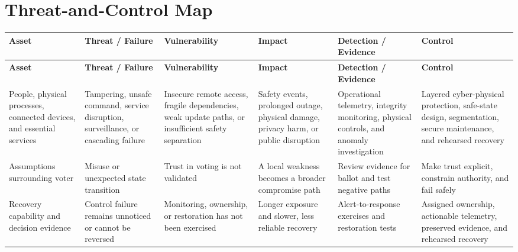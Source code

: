 \documentclass[11pt,letterpaper]{article}
\begin{document}
\section*{Threat-and-Control Map}
\begingroup\scriptsize\setlength{\tabcolsep}{2pt}
\begin{longtable}{>{\raggedright\arraybackslash}p{}>{\raggedright\arraybackslash}p{}>{\raggedright\arraybackslash}p{}>{\raggedright\arraybackslash}p{}>{\raggedright\arraybackslash}p{}>{\raggedright\arraybackslash}p{}}
\toprule\rowcolor{Navy}\color{white}\textbf{Asset} & \color{white}\textbf{Threat / Failure} & \color{white}\textbf{Vulnerability} & \color{white}\textbf{Impact} & \color{white}\textbf{Detection / Evidence} & \color{white}\textbf{Control}\\\midrule
\endfirsthead
\toprule\rowcolor{Navy}\color{white}\textbf{Asset} & \color{white}\textbf{Threat / Failure} & \color{white}\textbf{Vulnerability} & \color{white}\textbf{Impact} & \color{white}\textbf{Detection / Evidence} & \color{white}\textbf{Control}\\\midrule
\endhead
People, physical processes, connected devices, and essential services & Tampering, unsafe command, service disruption, surveillance, or cascading failure & Insecure remote access, fragile dependencies, weak update paths, or insufficient safety separation & Safety events, prolonged outage, physical damage, privacy harm, or public disruption & Operational telemetry, integrity monitoring, physical controls, and anomaly investigation & Layered cyber-physical protection, safe-state design, segmentation, secure maintenance, and rehearsed recovery\\\midrule
Assumptions surrounding voter & Misuse or unexpected state transition & Trust in voting is not validated & A local weakness becomes a broader compromise path & Review evidence for ballot and test negative paths & Make trust explicit, constrain authority, and fail safely\\\midrule
Recovery capability and decision evidence & Control failure remains unnoticed or cannot be reversed & Monitoring, ownership, or restoration has not been exercised & Longer exposure and slower, less reliable recovery & Alert-to-response exercises and restoration tests & Assigned ownership, actionable telemetry, preserved evidence, and rehearsed recovery\\\midrule
\bottomrule
\end{longtable}
\endgroup
\end{document}
